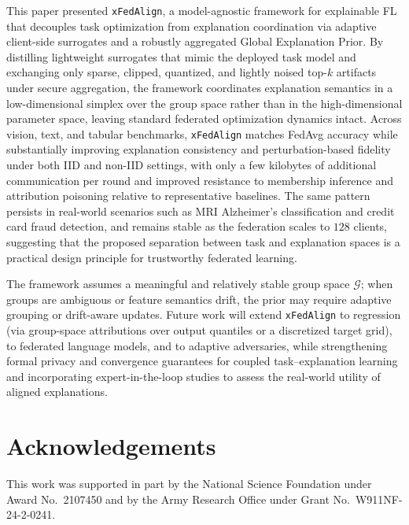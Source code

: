 \documentclass{article}
\theoremstyle{plain}
\theoremstyle{definition}
\theoremstyle{remark}
\begin{document}
This paper presented \texttt{xFedAlign}, a model-agnostic framework for explainable FL that decouples task optimization from explanation coordination via adaptive client-side surrogates and a robustly aggregated Global Explanation Prior. By distilling lightweight surrogates that mimic the deployed task model and exchanging only sparse, clipped, quantized, and lightly noised top-$k$ artifacts under secure aggregation, the framework coordinates explanation semantics in a low-dimensional simplex over the group space rather than in the high-dimensional parameter space, leaving standard federated optimization dynamics intact. Across vision, text, and tabular benchmarks, \texttt{xFedAlign} matches FedAvg accuracy while substantially improving explanation consistency and perturbation-based fidelity under both IID and non-IID settings, with only a few kilobytes of additional communication per round and improved resistance to membership inference and attribution poisoning relative to representative baselines. The same pattern persists in real-world scenarios such as MRI Alzheimer's classification and credit card fraud detection, and remains stable as the federation scales to $128$ clients, suggesting that the proposed separation between task and explanation spaces is a practical design principle for trustworthy federated learning.

The framework assumes a meaningful and relatively stable group space $\mathcal{G}$; when groups are ambiguous or feature semantics drift, the prior may require adaptive grouping or drift-aware updates. Future work will extend \texttt{xFedAlign} to regression (via group-space attributions over output quantiles or a discretized target grid), to federated language models, and to adaptive adversaries, while strengthening formal privacy and convergence guarantees for coupled task--explanation learning and incorporating expert-in-the-loop studies to assess the real-world utility of aligned explanations.

\section*{Acknowledgements}
This work was supported in part by the National Science Foundation under Award No.~2107450 and by the Army Research Office under Grant No.~W911NF-24-2-0241.

\end{document}

